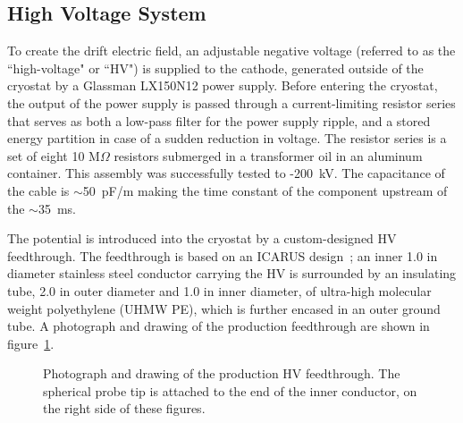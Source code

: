 %
\subsection{High Voltage System}
\label{sec:hv}

To create the drift electric field, an adjustable negative voltage (referred to as the ``high-voltage" or ``HV") is supplied to the \lartpc cathode, generated outside of the cryostat by a Glassman LX150N12 power supply.  Before entering the cryostat, the output of the power supply is passed through a current-limiting resistor series that serves as both a low-pass filter for the power supply ripple, and a stored energy partition in case of a sudden reduction in voltage.  The resistor series is a set of eight 10 M$\Omega$ resistors submerged in a transformer oil in an aluminum container.  This assembly was successfully tested to -200~kV. The capacitance of the cable is $\sim$50~pF/m making the time constant of the component upstream of the \lartpc $\sim$35~ms.

The potential is introduced into the cryostat by a custom-designed HV feedthrough.  The feedthrough is based on an ICARUS design~\cite{Amerio:2004-T600}; an inner 1.0 in diameter stainless steel conductor carrying the HV is surrounded by an insulating tube, 2.0 in outer diameter and 1.0 in inner diameter, of ultra-high molecular weight polyethylene (UHMW PE), which is further encased in an outer ground tube.  A photograph and drawing of the production feedthrough are shown in figure~\ref{fig:hv_ftpic}.

\begin{figure}[htb]
\caption{Photograph and drawing of the production HV feedthrough. The spherical probe tip is attached to the end of the inner conductor, on the right side of these figures.}
\label{fig:hv_ftpic}
\end{figure}

